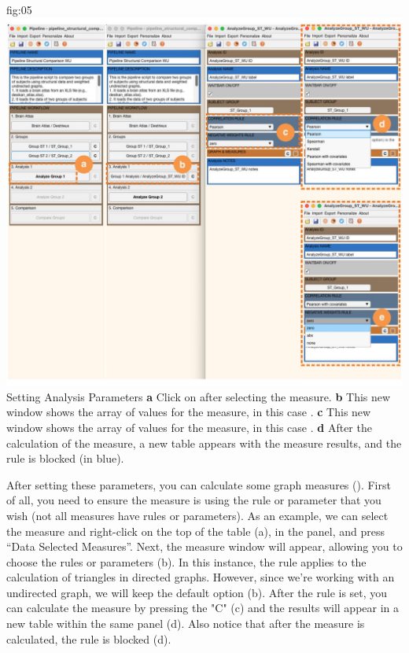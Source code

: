\documentclass[justified]{tufte-handout}
\begin{document}
	{fig:05}
	{
	\includegraphics{fig05.jpg}
	}
	{Setting Analysis Parameters}
	{
	{\bf a} Click on  after selecting the measure.
	{\bf b} This new window shows the array of values for the measure, in this case .
 	{\bf c} This new window shows the array of values for the measure, in this case .
  	{\bf d} After the calculation of the measure, a new table appears with the measure results, and the rule is blocked (in blue).
	}
 
 After setting these parameters, you can calculate some graph measures (). First of all, you need to ensure the measure is using the rule or parameter that you wish (not all measures have rules or parameters). As an example, we can select the measure  and right-click on the top of the table (a), in the  panel, and press “Data Selected Measures”. 
 Next, the measure window will appear, allowing you to choose the rules or parameters (b). In this instance, the rule applies to the calculation of triangles in directed graphs. However, since we're working with an undirected graph, we will keep the default option (b).
After the rule is set, you can calculate the measure by pressing the "C" (c) and the results will appear in a new table within the same panel (d). Also notice that after the measure is calculated, the rule is blocked (d).
 
\end{document}
